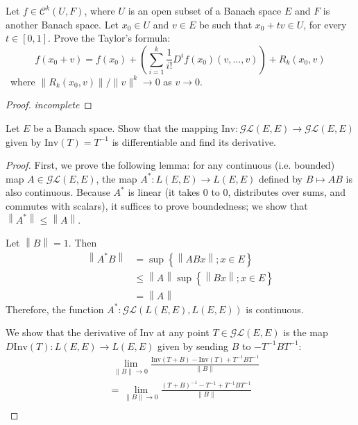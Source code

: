 \documentclass[12pt]{article}
\theoremstyle{definition}
\newenvironment{problem}[2][Problem]{\begin{trivlist}
\item[\hskip \labelsep {\bfseries #1}\hskip \labelsep {\bfseries #2.}]}{\end{trivlist}}
\begin{document}
\begin{problem}{2}
    Let $f \in \mathcal{C}^k(U,F)$, where $U$ is an open subset of a Banach space $E$ and $F$ is another Banach space. Let $x_0 \in U$ and $v \in E$ be such that $x_0 + tv \in U$, for every $t \in [0,1]$. Prove the Taylor's formula:
    \[
    f(x_0 + v) = f(x_0) + \left ( \sum_{i = 1}^k \frac{1}{i!} D^i f(x_0)(v, \dots , v) \right ) + R_k(x_0, v)
    \]\
    where $\lVert R_k(x_0, v) \rVert / \lVert v \rVert^k \to 0$ as $v \to 0$.
    \begin{proof}
	    \textit{incomplete} 
    \end{proof}
\end{problem}
\begin{problem}{3}
Let $E$ be a Banach space. Show that the mapping $\text{Inv}: \mathcal{GL}(E,E) \to \mathcal{GL}(E,E)$ given by $\text{Inv}(T) = T^{-1}$ is differentiable and find its derivative.
\begin{proof}
	\par 	First, we prove the following lemma: for any continuous (i.e. bounded) map $A \in \mathcal{GL}(E,E)$, the map $A^* : L(E,E) \to L(E,E)$ defined by $B \mapsto AB$ is also continuous. Because $A^*$ is linear (it takes 0 to 0, distributes over sums, and commutes with scalars), it suffices to prove boundedness; we show that $\left \lVert { A^* } \right \lVert \leq \left \lVert { A } \right \lVert $.
	\par Let $\left \lVert { B } \right \lVert = 1$. Then
	\begin{align*}
		\left \lVert { A^*B } \right \lVert &= \sup\left\{ \left \lVert { ABx } \right \lVert ; x \in E \right\}\\
		&\leq \left \lVert { A } \right \lVert \sup\left\{ \left \lVert { Bx } \right \lVert ; x \in E \right\}\\
		&= \left \lVert { A } \right \lVert 
	\end{align*}
	Therefore, the function $A^*: \mathcal{GL}(L(E,E), L(E,E))$ is continuous.
\par We show that the derivative of $\text{Inv}$ at any point $T \in \mathcal{GL}(E,E)$ is the map $D\text{Inv}(T): L(E,E) \to L(E,E)$ given by sending $B$ to $-T^{-1}BT^{-1}$:
\begin{align*}
    &\;\lim_{\lVert B \rVert \to 0} \frac{\text{Inv}(T + B) - \text{Inv}(T) + T^{-1}BT^{-1}}{\lVert B \rVert} \\
    &= \lim_{\lVert B \rVert \to 0} \frac{(T + B)^{-1} - T^{-1} + T^{-1}BT^{-1}}{\lVert B \rVert}\\

\end{align*}
\end{proof}
\end{problem}
\end{document}
